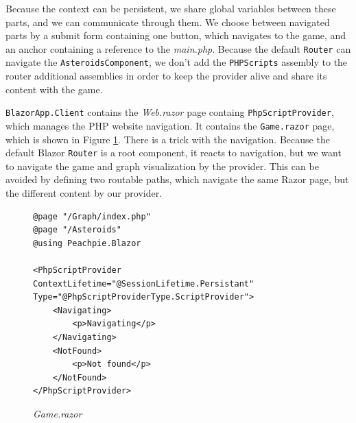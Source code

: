 Because the context can be persistent, we share global variables between these parts, and we can communicate through them.
We choose between navigated parts by a submit form containing one button, which navigates to the game, and an anchor containing a reference to the \textit{main.php}.
Because the default \texttt{Router} can navigate the \texttt{AsteroidsComponent}, we don't add the \texttt{PHPScripts} assembly to the router additional assemblies in order to keep the provider alive and share its content with the game.
\par
\texttt{BlazorApp.Client} contains the \textit{Web.razor} page containg \texttt{PhpScriptProvider}, which manages the PHP website navigation.
It contains the \texttt{Game.razor} page, which is shown in Figure \ref{img29:razor}.
There is a trick with the navigation.
Because the default Blazor \texttt{Router} is a root component, it reacts to navigation, but we want to navigate the game and graph visualization by the provider.
This can be avoided by defining two routable paths, which navigate the same Razor page, but the different content by our provider.
\par
\begin{figure}[!b]
\begin{lstlisting}
@page "/Graph/index.php"
@page "/Asteroids"
@using Peachpie.Blazor

<PhpScriptProvider ContextLifetime="@SessionLifetime.Persistant" 
Type="@PhpScriptProviderType.ScriptProvider">
    <Navigating>
        <p>Navigating</p>
    </Navigating>
    <NotFound>
        <p>Not found</p>
    </NotFound>
</PhpScriptProvider>
\end{lstlisting}
\caption{\textit{Game.razor}}
\label{img29:razor}
\end{figure}
